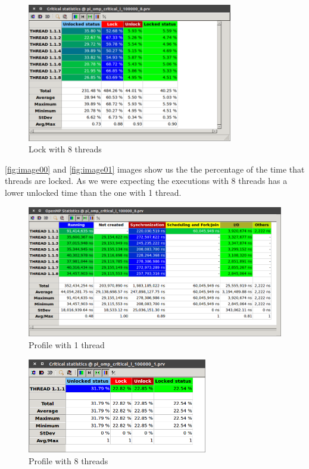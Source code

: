 \documentclass[a4paper]{article}
\begin{document}
\begin{figure}[H]
    \centering
    \includegraphics[width=0.8\textwidth]{images/image01}
    \caption{Lock with 8 threads}
    \label{fig:image01}
\end{figure}

\autoref{fig:image00} and \autoref{fig:image01} images show us the the percentage of the time that threads are locked. As we were expecting the executions with 8 threads has a lower unlocked time than the one with 1 thread.

\begin{figure}[H]
    \centering
    \includegraphics[width=\textwidth]{images/image02}
    \caption{Profile with 1 thread}
    \label{fig:image02}
\end{figure}

\begin{figure}[H]
    \centering
    \includegraphics[width=0.7\textwidth]{images/image03}
    \caption{Profile with 8 threads}
    \label{fig:image03}
\end{figure}
\end{document}
